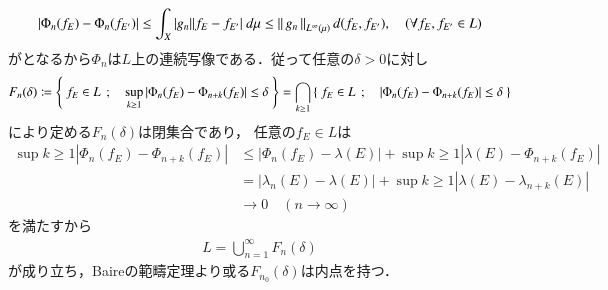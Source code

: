\begin{prf}
\begin{description}
\begin{align}
					\left| \Phi_n(f_E) - \Phi_n(f_{E'}) \right|
					\leq \int_X |g_n| |f_E - f_{E'}|\ d\mu
					\leq \left\|\, g_n\, \right\|_{L^\infty(\mu)} d(f_E,f_{E'}),
					\quad (\forall f_E,f_{E'} \in L)
				\end{align}
				がとなるから$\Phi_n$は$L$上の連続写像である．従って任意の$\delta > 0$に対し
				\begin{align}
					F_n(\delta) 
					\coloneqq \left\{\ f_E \in L\ \, ; \quad \operatorname*{sup}_{k \geq 1} \left| \Phi_n(f_E)-\Phi_{n+k}(f_E) \right| \leq \delta\ \right\}
					= \bigcap_{k \geq 1} \left\{\ f_E \in L\ \, ; \quad \left| \Phi_n(f_E)-\Phi_{n+k}(f_E) \right| \leq \delta\ \right\}
				\end{align}
				により定める$F_n(\delta)$は閉集合であり，
				任意の$f_E \in L$は
				\begin{align}
					\sup{k \geq 1}{\left| \Phi_n(f_E)-\Phi_{n+k}(f_E) \right|}
					&\leq \left| \Phi_n(f_E)-\lambda(E) \right|
						+ \sup{k \geq 1}{\left| \lambda(E)-\Phi_{n+k}(f_E) \right|} \\
					&= \left| \lambda_n(E)-\lambda(E) \right|
						+ \sup{k \geq 1}{\left| \lambda(E)-\lambda_{n+k}(E) \right|} \\
					&\longrightarrow 0 \quad (n \longrightarrow \infty)
				\end{align}
				を満たすから
				\begin{align}
					L = \bigcup_{n=1}^\infty F_n(\delta)
				\end{align}
				が成り立ち，Baireの範疇定理より或る$F_{n_0}(\delta)$は内点を持つ．
				

\end{description}
\end{prf}
